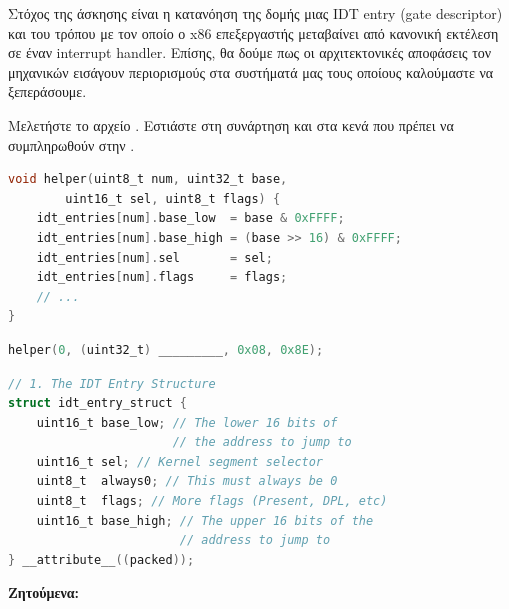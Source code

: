 \documentclass[18pt]{extarticle}
\begin{document}
\begin{question}    
    Στόχος της άσκησης είναι η κατανόηση της δομής μιας IDT entry (gate descriptor) και του τρόπου με τον οποίο ο x86 επεξεργαστής 
    μεταβαίνει από κανονική εκτέλεση σε έναν interrupt handler. Επίσης, θα δούμε πως οι αρχιτεκτονικές αποφάσεις τον μηχανικών εισάγουν 
    περιορισμούς στα συστήματά μας τους οποίους καλούμαστε να ξεπεράσουμε.

    Μελετήστε το αρχείο . Εστιάστε στη συνάρτηση  και στα κενά που πρέπει να συμπληρωθούν στην .

    \begin{file}
    \footnotesize \begin{lstlisting}[language=C, tabsize=2]
void helper(uint8_t num, uint32_t base, 
        uint16_t sel, uint8_t flags) {
    idt_entries[num].base_low  = base & 0xFFFF;
    idt_entries[num].base_high = (base >> 16) & 0xFFFF;
    idt_entries[num].sel       = sel;
    idt_entries[num].flags     = flags;
    // ...
}
    \end{lstlisting}
    \end{file}

    \begin{file}
        \footnotesize \begin{lstlisting}[language=C, tabsize=2]
helper(0, (uint32_t) _________, 0x08, 0x8E);
    \end{lstlisting}
    \end{file}

    \begin{file}
        \footnotesize \begin{lstlisting}[language=C, tabsize=2]
// 1. The IDT Entry Structure
struct idt_entry_struct {
    uint16_t base_low; // The lower 16 bits of
                       // the address to jump to
    uint16_t sel; // Kernel segment selector
    uint8_t  always0; // This must always be 0
    uint8_t  flags; // More flags (Present, DPL, etc)
    uint16_t base_high; // The upper 16 bits of the 
                        // address to jump to
} __attribute__((packed));
    \end{lstlisting}
    \end{file}

    \textbf{Ζητούμενα:}
    

\end{question}
\end{document}
